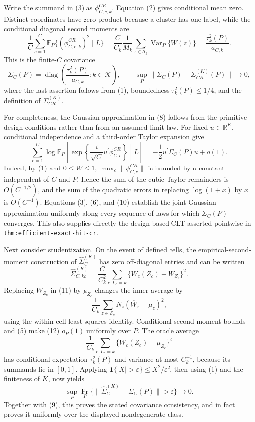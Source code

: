 Write the summand in (3) as \(\phi^{CR}_{C,c,k}\).  Equation (2) gives conditional mean zero.  Distinct coordinates have zero product because a cluster has one label, while the conditional diagonal second moments are
\[
 \frac1C\sum_{c=1}^C
 \mathbb E_P\{(\phi^{CR}_{C,c,k})^2\mid L\}
 =\frac{C}{C_k}\frac1{M_k}
   \sum_{z\in\mathcal S_k}\operatorname{Var}_P\{W(z)\}
 =\frac{\tau_k^2(P)}{a_{C,k}}.                                                \tag{8}
\]
This is the finite-\(C\) covariance
\[
 \Sigma_C(P)=\operatorname{diag}\!\left(\frac{\tau_k^2(P)}{a_{C,k}}:
 k\in\mathcal K\right),
 \qquad
 \sup_P\|\Sigma_C(P)-\Sigma_{CR}^{(K)}(P)\|\longrightarrow0,               \tag{9}
\]
where the last assertion follows from (1), boundedness \(\tau_k^2(P)\leq1/4\), and the definition of \(\Sigma_{CR}^{(K)}\).

For completeness, the Gaussian approximation in (8) follows from the primitive design conditions rather than from an assumed limit law.  For fixed \(u\in\mathbb R^K\), conditional independence and a third-order Taylor expansion give
\[
 \sum_{c=1}^C\log\mathbb E_P\!\left[
   \exp\!\left\{\frac{i}{\sqrt C}u^{\prime}\phi^{CR}_{C,c}\right\}
   \middle|L\right]
 =-\frac12u^{\prime}\Sigma_C(P)u+o(1).                                      \tag{10}
\]
Indeed, by (1) and \(0\leq W\leq1\), \(\max_c\|\phi^{CR}_{C,c}\|\) is bounded by a constant independent of \(C\) and \(P\).  Hence the sum of the cubic Taylor remainders is \(O(C^{-1/2})\), and the sum of the quadratic errors in replacing \(\log(1+x)\) by \(x\) is \(O(C^{-1})\).  Equations (3), (6), and (10) establish the joint Gaussian approximation uniformly along every sequence of laws for which \(\Sigma_C(P)\) converges.  This also supplies directly the design-based CLT asserted pointwise in \texttt{thm:efficient-exact-hit-cr}.

Next consider studentization.  On the event of defined cells, the empirical-second-moment construction of \(\widehat\Sigma_C^{(K)}\) has zero off-diagonal entries and can be written
\[
 \widehat\Sigma_{C,kk}^{(K)}
 =\frac{C}{C_k^2}\sum_{c:L_c=k}
       \{W_c(Z_c)-\overline W_{Z_c}\}^2.                                    \tag{11}
\]
Replacing \(\overline W_{Z_c}\) in (11) by \(\mu_{Z_c}\) changes the inner average by
\[
 \frac1{C_k}\sum_{z\in\mathcal S_k}
 N_z(\overline W_z-\mu_z)^2,                                                  \tag{12}
\]
using the within-cell least-squares identity.  Conditional second-moment bounds and (5) make (12) \(o_P(1)\) uniformly over \(P\).  The oracle average
\[
 \frac1{C_k}\sum_{c:L_c=k}\{W_c(Z_c)-\mu_{Z_c}\}^2
\]
has conditional expectation \(\tau_k^2(P)\) and variance at most \(C_k^{-1}\), because its summands lie in \([0,1]\).  Applying \(\mathbf 1\{|X|>\varepsilon\}\leq X^2/\varepsilon^2\), then using (1) and the finiteness of \(K\), now yields
\[
 \sup_P\Pr_P\{\|\widehat\Sigma_C^{(K)}-\Sigma_C(P)\|>\varepsilon\}
 \longrightarrow0.                                                           \tag{13}
\]
Together with (9), this proves the stated covariance consistency, and in fact proves it uniformly over the displayed nondegenerate class.

